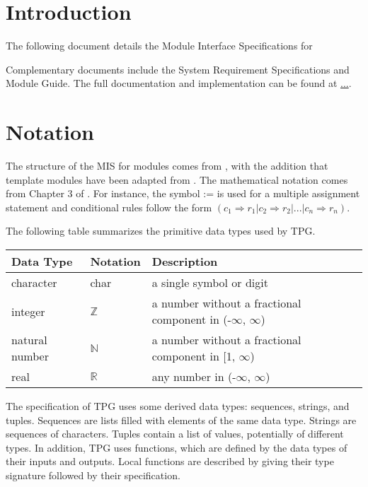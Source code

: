 \documentclass[12pt, titlepage]{article}
\begin{document}
\newpage

\tableofcontents

\newpage


\section{Introduction}

The following document details the Module Interface Specifications for

Complementary documents include the System Requirement Specifications
and Module Guide.  The full documentation and implementation can be
found at \url{...}.  

\section{Notation}
The structure of the MIS for modules comes from \citet{HoffmanAndStrooper1995},
with the addition that template modules have been adapted from
\cite{GhezziEtAl2003}.  The mathematical notation comes from Chapter 3 of
\citet{HoffmanAndStrooper1995}.  For instance, the symbol := is used for a
multiple assignment statement and conditional rules follow the form $(c_1
\Rightarrow r_1 | c_2 \Rightarrow r_2 | ... | c_n \Rightarrow r_n )$.

The following table summarizes the primitive data types used by TPG. 

\begin{center}
\renewcommand{\arraystretch}{1.2}
\noindent 
\begin{tabular}{l l p{7.5cm}} 
\toprule 
\textbf{Data Type} & \textbf{Notation} & \textbf{Description}\\ 
\midrule
character & char & a single symbol or digit\\
integer & $\mathbb{Z}$ & a number without a fractional component in (-$\infty$, $\infty$) \\
natural number & $\mathbb{N}$ & a number without a fractional component in [1, $\infty$) \\
real & $\mathbb{R}$ & any number in (-$\infty$, $\infty$)\\
\bottomrule
\end{tabular} 
\end{center}

\noindent
The specification of TPG uses some derived data types: sequences, strings, and
tuples. Sequences are lists filled with elements of the same data type. Strings
are sequences of characters. Tuples contain a list of values, potentially of
different types. In addition, TPG uses functions, which
are defined by the data types of their inputs and outputs. Local functions are
described by giving their type signature followed by their specification.
\end{document}
